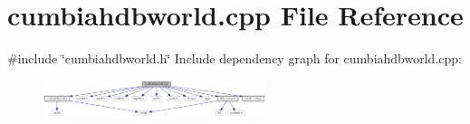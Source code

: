 \section{cumbiahdbworld.\+cpp File Reference}
\label{cumbiahdbworld_8cpp}
{\ttfamily \#include \char`\"{}cumbiahdbworld.\+h\char`\"{}}\newline
Include dependency graph for cumbiahdbworld.\+cpp\+:
\nopagebreak
\begin{figure}[H]
\begin{center}
\leavevmode
\includegraphics[width=184pt]{cumbiahdbworld_8cpp__incl}
\end{center}
\end{figure}
